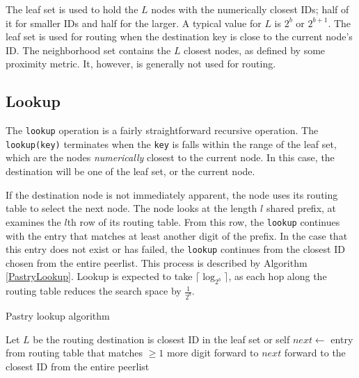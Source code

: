 The leaf set is used to hold the $L$ nodes with the numerically closest IDs;  half of it for smaller IDs and half for the larger.
A typical value for $L$ is $2^b$ or $2^{b+1}$.
The leaf set is used for routing when the destination key is close to the current node's ID.
The neighborhood set contains the $L$ closest nodes, as defined by some proximity metric.  
It, however, is generally not used for routing.  



\subsection*{Lookup}
The \texttt{lookup} operation is a fairly straightforward recursive operation.
The \texttt{lookup(key)} terminates when the \texttt{key} is falls within the range of the leaf set, which are the nodes \emph{numerically} closest to the current node.
In this case, the destination will be one of the leaf set, or the current node.

If the destination node is not immediately apparent, the node uses its routing table to select the next node.
The node looks at the length $l$ shared prefix,  at examines the $l$th row of its routing table.
From this row, the \texttt{lookup} continues with the entry that matches at least another digit of the prefix.
In the case that this entry does not exist or has failed, the \texttt{lookup} continues from the closest ID chosen from the entire peerlist.
This process is described by Algorithm \ref{PastryLookup}.
Lookup is expected  to take $\lceil \log_{2^{b}} \rceil $, as each hop along the routing table reduces the search space by $\frac{1}{2^{b}}$.
 
\begin{algorithm}
    \caption{Pastry lookup algorithm}
    \label{PastryLookup}
    \begin{algorithmic}
        \State Let $L$ be the routing  
            	\State destination is closest ID in the leaf set or self
            \Else
            	\State $next\gets$ entry from routing table that matches $\geq 1$ more digit
                	\State forward to $next$
            	\Else
                	\State forward to the closest ID from the entire peerlist
                \EndIf
                
            \EndIf
        \EndFunction
    \end{algorithmic}
\end{algorithm}

